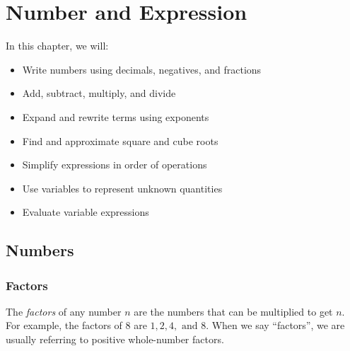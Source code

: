 

\chapter{Number and Expression}

\begin{summary}
In this chapter, we will:
\begin{itemize}
    \item Write numbers using decimals, negatives, and fractions
    \item Add, subtract, multiply, and divide
    \item Expand and rewrite terms using exponents
    \item Find and approximate square and cube roots
    \item Simplify expressions in order of operations 
    \item Use variables to represent unknown quantities
    \item Evaluate variable expressions
    
\end{itemize}
\end{summary}



\newpage 
\section{Numbers}

\subsection{Factors}
The \emph{factors} of any number \(n\) are the numbers that can be multiplied to get \(n\).  For example, the factors of \(8\) are \(1, 2, 4, \text{ and } 8\). When we say ``factors'', we are usually referring to positive whole-number factors. 

